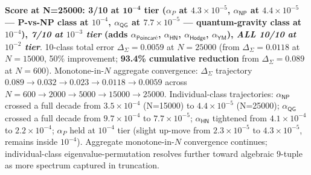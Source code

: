 \documentclass[11pt,a4paper]{amsart}
\theoremstyle{plain}
\theoremstyle{definition}
\begin{document}
\textbf{Score at N=25000: 3/10 at $\mathbf{10^{-4}}$ tier ($\alpha_P$ at $4.3\times 10^{-5}$, \textbf{$\alpha_{\textsf{NP}}$ at $4.4\times 10^{-5}$ --- P-vs-NP class at $10^{-4}$}, \textbf{$\alpha_{\textsf{QG}}$ at $7.7\times 10^{-5}$ --- quantum-gravity class at $10^{-4}$}), \emph{7/10 at $10^{-3}$ tier} (adds $\alpha_{\textsf{Poincar\'e}}$, $\alpha_{\textsf{HN}}$, $\alpha_{\textsf{Hodge}}$, $\alpha_{\textsf{YM}}$), \emph{ALL 10/10 at $10^{-2}$ tier}}. 10-class total error $\Delta_{\Sigma} = 0.0059$ at $N = 25000$ (from $\Delta_{\Sigma} = 0.0118$ at $N = 15000$, 50\% improvement; \textbf{93.4\% cumulative reduction} from $\Delta_{\Sigma} = 0.089$ at $N = 600$). Monotone-in-$N$ aggregate convergence: $\Delta_{\Sigma}$ trajectory $0.089 \to 0.032 \to 0.023 \to 0.0118 \to \mathbf{0.0059}$ across $N = 600 \to 2000 \to 5000 \to 15000 \to 25000$. Individual-class trajectories: $\alpha_{\textsf{NP}}$ crossed a full decade from $3.5\times 10^{-4}$ (N=15000) to $4.4\times 10^{-5}$ (N=25000); $\alpha_{\textsf{QG}}$ crossed a full decade from $9.7\times 10^{-4}$ to $7.7\times 10^{-5}$; $\alpha_{\textsf{HN}}$ tightened from $4.1\times 10^{-4}$ to $2.2\times 10^{-4}$; $\alpha_P$ held at $10^{-4}$ tier (slight up-move from $2.3\times 10^{-5}$ to $4.3\times 10^{-5}$, remains inside $10^{-4}$). Aggregate monotone-in-$N$ convergence continues; individual-class eigenvalue-permutation resolves further toward algebraic 9-tuple as more spectrum captured in truncation.
\end{document}
